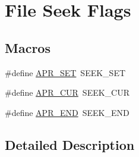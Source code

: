 \hypertarget{group__apr__file__seek__flags}{\section{File Seek Flags}
\label{group__apr__file__seek__flags}
}
\subsection*{Macros}
\begin{DoxyCompactItemize}
\item 
\#define \hyperlink{group__apr__file__seek__flags_ga2fdf78845c897f69451d49e1e2b90ac9}{A\-P\-R\-\_\-\-S\-E\-T}~S\-E\-E\-K\-\_\-\-S\-E\-T
\item 
\#define \hyperlink{group__apr__file__seek__flags_gae17abc53fea00bfd51e184017113e250}{A\-P\-R\-\_\-\-C\-U\-R}~S\-E\-E\-K\-\_\-\-C\-U\-R
\item 
\#define \hyperlink{group__apr__file__seek__flags_ga438f3568be799d1e4bbd19492ca47d22}{A\-P\-R\-\_\-\-E\-N\-D}~S\-E\-E\-K\-\_\-\-E\-N\-D
\end{DoxyCompactItemize}


\subsection{Detailed Description}


